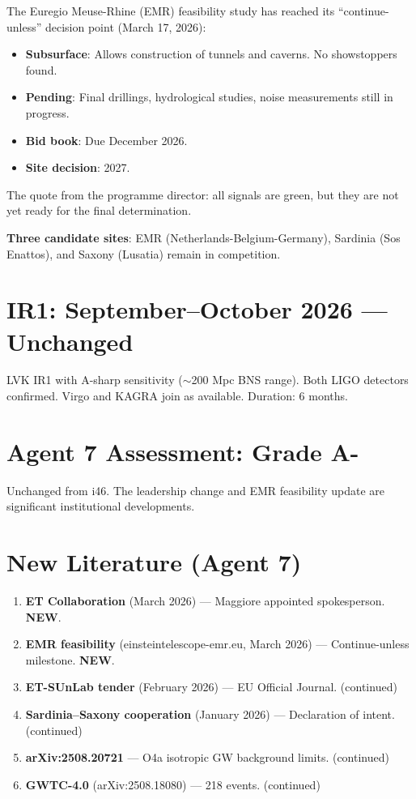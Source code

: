 \documentclass[11pt,a4paper]{article}
\newcommand{\NEW}{\textcolor{dfdblue}{\textbf{NEW}}}
\begin{document}
\begin{tcolorbox}[colback=blue!5!white, colframe=blue!60!black,
  title={EMR Bid: March 2026 Update --- Continue-Unless Milestone Passed}]

The Euregio Meuse-Rhine (EMR) feasibility study has reached its ``continue-unless'' decision point (March 17, 2026):
\begin{itemize}
\item \textbf{Subsurface}: Allows construction of tunnels and caverns. No showstoppers found.
\item \textbf{Pending}: Final drillings, hydrological studies, noise measurements still in progress.
\item \textbf{Bid book}: Due December 2026.
\item \textbf{Site decision}: 2027.
\end{itemize}

The quote from the programme director: all signals are green, but they are not yet ready for the final determination.

\textbf{Three candidate sites}: EMR (Netherlands-Belgium-Germany), Sardinia (Sos Enattos), and Saxony (Lusatia) remain in competition.
\end{tcolorbox}

\section{IR1: September--October 2026 --- Unchanged}

LVK IR1 with A-sharp sensitivity ($\sim$200 Mpc BNS range). Both LIGO detectors confirmed. Virgo and KAGRA join as available. Duration: 6 months.

\section{Agent 7 Assessment: Grade A-}

Unchanged from i46. The leadership change and EMR feasibility update are significant institutional developments.

\section{New Literature (Agent 7)}

\begin{enumerate}
\item \textbf{ET Collaboration} (March 2026) --- Maggiore appointed spokesperson. \NEW.
\item \textbf{EMR feasibility} (einsteintelescope-emr.eu, March 2026) --- Continue-unless milestone. \NEW.
\item \textbf{ET-SUnLab tender} (February 2026) --- EU Official Journal. (continued)
\item \textbf{Sardinia--Saxony cooperation} (January 2026) --- Declaration of intent. (continued)
\item \textbf{arXiv:2508.20721} --- O4a isotropic GW background limits. (continued)
\item \textbf{GWTC-4.0} (arXiv:2508.18080) --- 218 events. (continued)
\end{enumerate}
\end{document}
